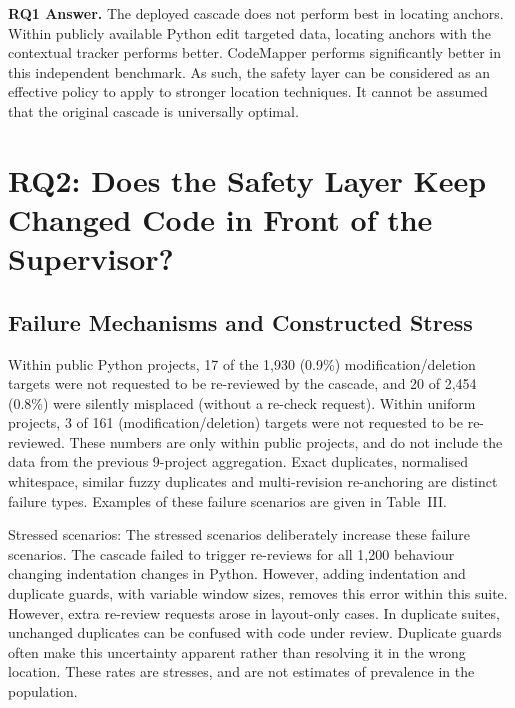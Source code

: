 \documentclass[10pt,conference,letterpaper]{IEEEtran}
\begin{document}
\textbf{RQ1 Answer.} The deployed cascade does not perform best in locating anchors. Within publicly available Python edit targeted data, locating anchors with the contextual tracker performs better. CodeMapper performs significantly better in this independent benchmark. As such, the safety layer can be considered as an effective policy to apply to stronger location techniques. It cannot be assumed that the original cascade is universally optimal.

\section{RQ2: Does the Safety Layer Keep Changed Code in Front of the Supervisor?}
\subsection{Failure Mechanisms and Constructed Stress}
Within public Python projects, 17 of the 1,930 (0.9\%) modification/deletion targets were not requested to be re-reviewed by the cascade, and 20 of 2,454 (0.8\%) were silently misplaced (without a re-check request). Within uniform projects, 3 of 161 (modification/deletion) targets were not requested to be re-reviewed. These numbers are only within public projects, and do not include the data from the previous 9-project aggregation. Exact duplicates, normalised whitespace, similar fuzzy duplicates and multi-revision re-anchoring are distinct failure types. Examples of these failure scenarios are given in Table~III.

Stressed scenarios: The stressed scenarios deliberately increase these failure scenarios. The cascade failed to trigger re-reviews for all 1,200 behaviour changing indentation changes in Python. However, adding indentation and duplicate guards, with variable window sizes, removes this error within this suite. However, extra re-review requests arose in layout-only cases. In duplicate suites, unchanged duplicates can be confused with code under review. Duplicate guards often make this uncertainty apparent rather than resolving it in the wrong location. These rates are stresses, and are not estimates of prevalence in the population.
\end{document}
